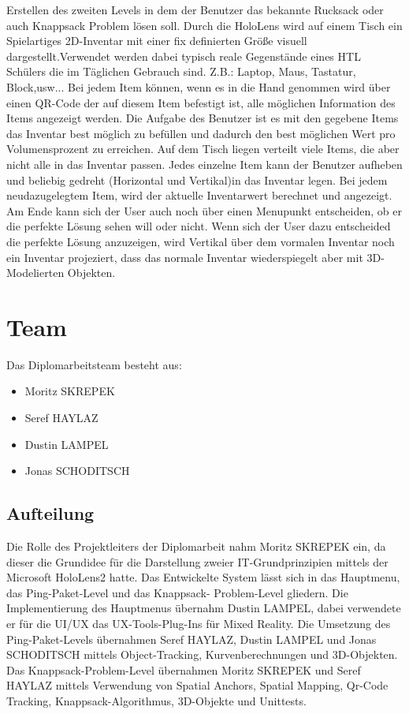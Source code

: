 Erstellen des zweiten Levels in dem der Benutzer das bekannte Rucksack oder auch Knappsack
Problem lösen soll. Durch die HoloLens wird auf einem Tisch ein Spielartiges 2D-Inventar
mit einer fix definierten Größe visuell dargestellt.Verwendet werden dabei typisch reale
Gegenstände eines HTL Schülers die im Täglichen Gebrauch sind. Z.B.: Laptop, Maus, Tastatur,
Block,usw... Bei jedem Item können, wenn es in die Hand genommen wird über einen
QR-Code der auf diesem Item befestigt ist, alle möglichen Information des Items
angezeigt werden. Die Aufgabe des Benutzer ist es mit den gegebene Items das
Inventar best möglich zu befüllen und dadurch den best möglichen Wert pro
Volumensprozent zu erreichen. Auf dem Tisch liegen verteilt viele Items, die aber
nicht alle in das Inventar passen. Jedes einzelne Item kann der Benutzer aufheben
und beliebig gedreht (Horizontal und Vertikal)in das Inventar legen. Bei jedem
neudazugelegtem Item, wird der aktuelle Inventarwert berechnet und angezeigt.
Am Ende kann sich der User auch noch über einen Menupunkt entscheiden, ob er
die perfekte Lösung sehen will oder nicht. Wenn sich der User dazu entscheided die
perfekte Lösung anzuzeigen, wird Vertikal über dem vormalen Inventar noch
ein Inventar projeziert, dass das normale Inventar wiederspiegelt aber mit
3D-Modelierten Objekten.

\section{Team}
Das Diplomarbeitsteam besteht aus:
\begin{itemize}
    \item Moritz SKREPEK
    \item Seref HAYLAZ
    \item Dustin LAMPEL
    \item Jonas SCHODITSCH
\end{itemize}


\subsection{Aufteilung}
Die Rolle des Projektleiters der Diplomarbeit nahm Moritz SKREPEK ein, da dieser die
Grundidee für die Darstellung zweier IT-Grundprinzipien mittels der Microsoft HoloLens2
hatte.
Das Entwickelte System lässt sich in das Hauptmenu, das Ping-Paket-Level und das Knappsack-
Problem-Level gliedern. Die Implementierung des Hauptmenus übernahm Dustin LAMPEL, dabei
verwendete er für die UI/UX das UX-Tools-Plug-Ins für Mixed Reality. Die Umsetzung des
Ping-Paket-Levels übernahmen Seref HAYLAZ, Dustin LAMPEL und Jonas SCHODITSCH mittels
Object-Tracking, Kurvenberechnungen und 3D-Objekten. Das Knappsack-Problem-Level übernahmen
Moritz SKREPEK und Seref HAYLAZ mittels Verwendung von Spatial Anchors, Spatial Mapping, Qr-Code
Tracking, Knappsack-Algorithmus, 3D-Objekte und Unittests.
